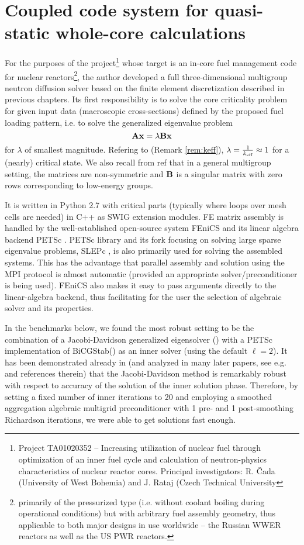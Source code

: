 \chapter{Coupled code system for quasi-static whole-core calculations}\label{chap:coupled}

For the purposes of the project\footnote{
Project TA01020352 -- Increasing utilization of nuclear fuel through optimization of an inner fuel cycle and
calculation of neutron-physics characteristics of nuclear reactor cores. Principal investigators: R. {\v C}ada
(University of West Bohemia) and J. Rataj (Czech Technical University} 
whose target is an in-core fuel management code for nuclear
reactors\footnote{ primarily of the pressurized type (i.e. without coolant boiling during operational conditions) but with arbitrary fuel
assembly geometry, thus applicable to both major designs in use worldwide -- the Russian WWER reactors as well as the
US PWR reactors.}, the author developed a full three-dimensional multigroup neutron diffusion solver based on the finite
element discretization described in previous chapters. Its first responsibility is to solve the core criticality problem
for given input data (macroscopic cross-sections) defined by the proposed fuel loading pattern, i.e. to solve the
generalized eigenvalue problem
$$
	\mathbf{A}\mathbf{x} = \lambda\mathbf{B}\mathbf{x}
$$
for $\lambda$ of smallest magnitude. Refering to  (Remark \ref{rem:keff}), $\lambda =
\frac{1}{k_{\text{eff}}} \approx 1$ for a (nearly) critical state. We also recall from \alert{ref} that in a general multigroup
setting, the matrices are non-symmetric and $\mathbf{B}$ is a singular matrix with zero rows corresponding to low-energy
groups.

It is written in Python 2.7 with critical parts (typically where loops over mesh cells are needed) in C++ as SWIG
extension modules. FE matrix assembly is handled by the well-established open-source system FEniCS \cite{dolfin1,
dolfin2} and its linear algebra backend PETSc \cite{petsc1}. PETSc library and its fork focusing on solving large sparse
eigenvalue problems, SLEPc \cite{slepc1}, is also primarily used for solving the assembled systems. This has the
advantage that parallel assembly and solution using the MPI protocol is almost automatic (provided an appropriate
solver/preconditioner is being used).
FEniCS also makes it easy to pass arguments directly to the linear-algebra backend, thus facilitating for the user the
selection of algebraic solver and its properties. 

In the benchmarks below, we found the most robust setting to be the combination of a Jacobi-Davidson generalized
eigensolver (\cite{slepcjd}) with a PETSc implementation of BiCGStab(\ell) \cite{Sleijpen1} as an inner solver (using
the default $\ell = 2$). It has been demonstrated already in \cite{Sleijpen1} (and analyzed in many later papers, see
e.g.  and references therein) that the Jacobi-Davidson method is remarkably robust with respect to accuracy
of the solution of the inner solution phase. Therefore, by setting a fixed number of inner iterations to 20 and
employing a smoothed aggregation algebraic multigrid preconditioner with 1 pre- and 1 post-smoothing Richardson
iterations, we were able to get solutions fast enough.
